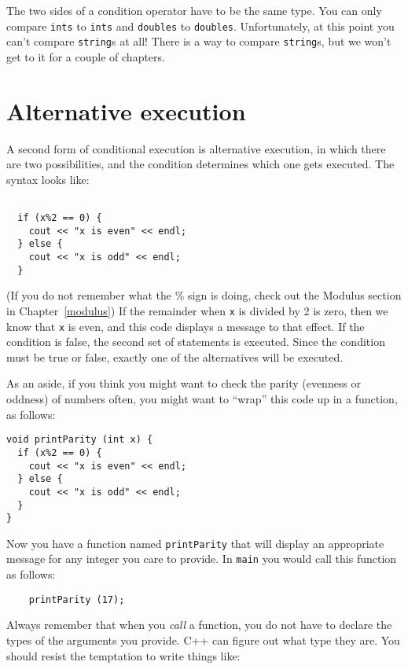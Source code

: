 The two sides of a condition operator have to be the same
type.  You can only compare {\tt ints} to {\tt ints} and
{\tt doubles} to {\tt doubles}.  Unfortunately, at this
point you can't compare {\tt string}s at all!  There is
a way to compare {\tt string}s, but we won't get to it for a couple
of chapters.

\section {Alternative execution}
\label{alternative}

A second form of conditional execution is alternative execution,
in which there are two possibilities, and the condition determines
which one gets executed.  The syntax looks like:

\begin{lstlisting}
    
  if (x%2 == 0) {
    cout << "x is even" << endl;
  } else {
    cout << "x is odd" << endl;
  }
\end{lstlisting}
%
(If you do not remember what the \% sign is doing, check out the
Modulus section in Chapter~\ref{modulus})
If the remainder when {\tt x} is divided by 2 is zero, then
we know that {\tt x} is even, and this code displays a message
to that effect.  If the condition is false, the second
set of statements is executed.  Since the condition must
be true or false, exactly one of the alternatives will be
executed.

As an aside, if you think you might want to check the parity
(evenness or oddness) of numbers often, you might want to
``wrap'' this code up in a function, as follows:

\begin{verbatim}
void printParity (int x) {
  if (x%2 == 0) {
    cout << "x is even" << endl;
  } else {
    cout << "x is odd" << endl;
  }
}
\end{verbatim}
%
Now you have a function named {\tt printParity} that will display
an appropriate message for any integer you care to provide.
In {\tt main} you would call this function as follows:

\begin{verbatim}
    printParity (17);
\end{verbatim}
%
Always remember that when you {\em call} a function, you do
not have to declare the types of the arguments you provide.
C++ can figure out what type they are.  You should resist the
temptation to write things like:

